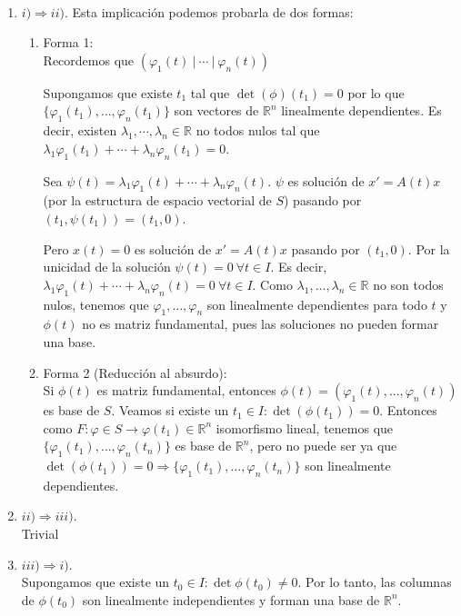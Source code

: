 \documentclass{article}
\makeatletter
\theoremstyle{theorem-style}  %
\theoremstyle{definition-style}
\theoremstyle{example-style}
\renewenvironment{proof}[1][\proofname]{\par
	\pushQED{\qed}%
	\normalfont \topsep6\p@\@plus6\p@\relax
	\list{}{%
		\settowidth{\leftmargin}{\quad:\hskip\labelsep}%
		\setlength{\labelwidth}{0pt}%
		\setlength{\itemindent}{-\leftmargin}%
	}%
	\item[\hskip\labelsep\itshape#1\@addpunct{:}]\ignorespaces
}{%
	\popQED\endlist\@endpefalse
}
\makeatother
\begin{document}
\begin{proof}\
	\begin{enumerate}
		\item $ i) \Rightarrow ii) $. Esta implicación podemos probarla de dos formas:
		\begin{enumerate}[\quad a)]
			\item Forma 1: \\
			Recordemos que $ (\varphi_1(t) \ | \ \cdots \ | \ \varphi_n(t)) $
			
			Supongamos que existe $ t_1 $ tal que  $ \det(\phi)(t_1)=0$ por lo que $\{ \varphi_1(t_1), \dots, \varphi_n(t_1) \} $ son vectores de $ \mathbb{R}^n  $ linealmente dependientes. Es decir, existen $ \lambda_1, \cdots, \lambda_n \in \mathbb{R}$ no todos nulos tal que $ \lambda_1 \varphi_1(t_1) + \cdots +\lambda_n\varphi_n(t_1)=0 $.
			
			Sea $ \psi(t)=\lambda_1 \varphi_1(t) + \cdots +\lambda_n\varphi_n(t) $. $ \psi $ es solución de $ x'=A(t)x $ (por la estructura de espacio vectorial de $ S $) pasando por $ (t_1,\psi(t_1))=(t_1,0) $.
			
			Pero $ x(t)=0 $ es solución de $ x'=A(t)x$ pasando por $ (t_1,0) $.
			Por la unicidad de la solución $ \psi(t)=0 \ \forall t \in I$. Es decir, $ \lambda_1 \varphi_1(t) + \cdots +\lambda_n\varphi_n(t) =0 \ \forall t \in I $. Como   $ \lambda_1, \dots, \lambda_n \in \mathbb{R}$ no son  todos nulos, tenemos que $ \varphi_1, \dots, \varphi_n $ son linealmente dependientes para todo $ t $ y $ \phi(t) $ no es matriz fundamental, pues las soluciones no pueden formar una base.
			\item Forma 2 (Reducción al absurdo): \\
			Si $ \phi(t) $ es matriz fundamental, entonces $ \phi(t)=(\varphi_1(t), ... , \varphi_n(t)) $ es base de $ S $.
			Veamos si existe un $ t_1 \in I : \det(\phi(t_1))=0$.
			Entonces como $ F:\varphi\in S\longrightarrow \varphi(t_1)\in  \mathbb{R}^n $ isomorfismo lineal, tenemos que $ \{ \varphi_1(t_1), \dots , \varphi_n(t_n) \}  $ es base de $ \mathbb{R}^n $, pero no puede ser ya que $ \det(\phi(t_1))=0 \Rightarrow \{ \varphi_1(t_1), \dots , \varphi_n(t_n) \} $ son linealmente dependientes.
		\end{enumerate}
	\item $ ii) \Rightarrow iii) $. \\
	Trivial
	\item $ iii) \Rightarrow i) $. \\
	Supongamos que existe un $ t_0 \in I : \det \phi (t_0)\neq 0 $. Por lo tanto, las columnas de $ \phi(t_0) $ son linealmente independientes y forman una base de $ \mathbb{R}^n $.
	

\end{enumerate}
\end{proof}
\end{document}
